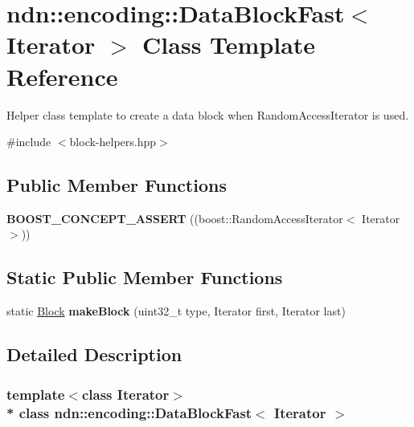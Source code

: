 \hypertarget{classndn_1_1encoding_1_1DataBlockFast}{}\section{ndn\+:\+:encoding\+:\+:Data\+Block\+Fast$<$ Iterator $>$ Class Template Reference}
\label{classndn_1_1encoding_1_1DataBlockFast}


Helper class template to create a data block when Random\+Access\+Iterator is used.  




{\ttfamily \#include $<$block-\/helpers.\+hpp$>$}

\subsection*{Public Member Functions}
\begin{DoxyCompactItemize}
\item 
{\bfseries B\+O\+O\+S\+T\+\_\+\+C\+O\+N\+C\+E\+P\+T\+\_\+\+A\+S\+S\+E\+RT} ((boost\+::\+Random\+Access\+Iterator$<$ Iterator $>$))\hypertarget{classndn_1_1encoding_1_1DataBlockFast_a2e5d654ddbd9fe57b553bd0397468c72}{}\label{classndn_1_1encoding_1_1DataBlockFast_a2e5d654ddbd9fe57b553bd0397468c72}

\end{DoxyCompactItemize}
\subsection*{Static Public Member Functions}
\begin{DoxyCompactItemize}
\item 
static \hyperlink{classndn_1_1Block}{Block} {\bfseries make\+Block} (uint32\+\_\+t type, Iterator first, Iterator last)\hypertarget{classndn_1_1encoding_1_1DataBlockFast_a0b21e66af96fb51daad38fc0ea3edbd1}{}\label{classndn_1_1encoding_1_1DataBlockFast_a0b21e66af96fb51daad38fc0ea3edbd1}

\end{DoxyCompactItemize}


\subsection{Detailed Description}
\subsubsection*{template$<$class Iterator$>$\\*
class ndn\+::encoding\+::\+Data\+Block\+Fast$<$ Iterator $>$}

